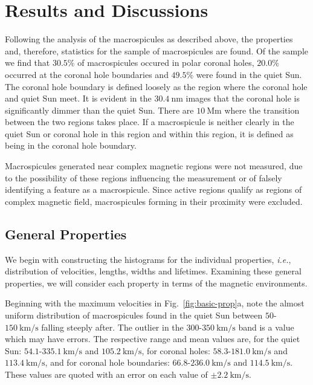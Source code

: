 \section{Results and Discussions}
Following the analysis of the macrospicules as described above, the properties and, therefore, statistics for the sample of macrospicules are found. Of the sample we find that $30.5\%$ of macrospicules occured in polar coronal holes, $20.0\%$ occurred at the coronal hole boundaries and $49.5\%$ were found in the quiet Sun. The coronal hole boundary is defined loosely as the region where the coronal hole and quiet Sun meet. It is evident in the $30.4\ \textrm{nm}$ images that the coronal hole is significantly dimmer than the quiet Sun. There are $10\ \textrm{Mm}$ where the transition between the two regions takes place. If a macrospicule is neither clearly in the quiet Sun or coronal hole in this region and within this region, it is defined as being in the coronal hole boundary.

Macrospicules generated near complex magnetic regions were not measured, due to the possibility of these regions influencing the measurement or of falsely identifying a feature as a macrospicule. Since active regions qualify as regions of complex magnetic field, macrospicules forming in their proximity were excluded.


\subsection{General Properties}
We begin with constructing the histograms for the individual properties, \emph{i.e.}, distribution of velocities, lengths, widths and lifetimes. Examining these general properties, we will consider each property in terms of the magnetic environments.

Beginning with the maximum velocities in Fig.~\ref{fig:basic-prop}a, note the almost uniform distribution of macrospicules found in the quiet Sun between $50$-$150\ \textrm{km/s}$ falling steeply after. The outlier in the $300$-$350\ \textrm{km/s}$ band is a value which may have errors. The respective range and mean values are, for the quiet Sun: $54.1$-$335.1\ \textrm{km/s}$ and $105.2\ \textrm{km/s}$, for coronal holes: $58.3$-$181.0\ \textrm{km/s}$ and $113.4\ \textrm{km/s}$, and for coronal hole boundaries: $66.8$-$236.0\ \textrm{km/s}$ and $114.5\ \textrm{km/s}$. These values are quoted with an error on each value of $\pm2.2\ \textrm{km/s}$.


